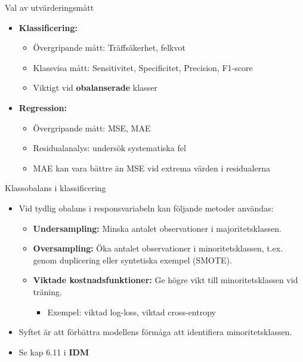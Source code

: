 \documentclass[10pt,english]{beamer}
\begin{document}
\begin{frame}{Val av utvärderingsmått}
\begin{itemize}
    \item \textbf{Klassificering:}
    \begin{itemize}
        \item Övergripande mått: Träffsäkerhet, felkvot
        \item Klassvisa mått: Sensitivitet, Specificitet, Precision, F1-score
        \item Viktigt vid \textbf{obalanserade} klasser
    \end{itemize}
    \item \textbf{Regression:}
    \begin{itemize}
        \item Övergripande mått: MSE, MAE 
        \item Residualanalys: undersök systematiska fel
        \item MAE kan vara bättre än MSE vid extrema värden i residualerna
    \end{itemize}
\end{itemize}
\end{frame}

\begin{frame}{Klassobalans i klassificering}
\begin{itemize}
    \item Vid tydlig obalans i responsvariabeln kan följande metoder användas:
    \begin{itemize}
        \item \textbf{Undersampling:} Minska antalet observationer i majoritetsklassen.
        \item \textbf{Oversampling:} Öka antalet observationer i minoritetsklassen, t.ex. genom duplicering eller syntetiska exempel (SMOTE).
        \item \textbf{Viktade kostnadsfunktioner:} Ge högre vikt till minoritetsklassen vid träning.
        \begin{itemize}
            \item Exempel: viktad log-loss, viktad cross-entropy
        \end{itemize}
    \end{itemize}
    \item Syftet är att förbättra modellens förmåga att identifiera minoritetsklassen.
    \item Se kap 6.11 i \textbf{IDM}
\end{itemize}
\end{frame}
\end{document}
